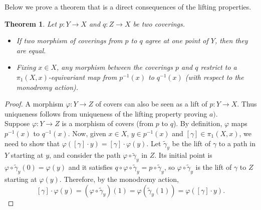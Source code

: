 \documentclass{article}
\theoremstyle{plain}
\newtheorem{theorem}{Theorem}[subsection]
\theoremstyle{definition}
\newtheorem{definition}[theorem]{Definition}
\begin{document}

\noindent Below we prove a theorem that is a direct consequences of the lifting properties.


\begin{theorem}
\label{property_morphism_covers}
    Let $p:Y\rightarrow X$ and $q:Z\rightarrow X$ be two coverings. 
    \begin{itemize}
        \item[$a)$] If two morphism of coverings from $p$ to $q$ agree at one point of $Y$, then they are equal.
        \item[$b)$] Fixing $x\in X$, any morphism between the coverings $p$ and $q$ restrict to a $\pi_1(X,x)$-equivariant map from $p^{-1}(x)$ to $q^{-1}(x)$ (with respect to the monodromy action).
    \end{itemize}
\end{theorem}
\begin{proof}
    A morphism $\varphi:Y\rightarrow Z$ of covers can also be seen as a lift of $p:Y\rightarrow X$. Thus uniqueness follows from uniqueness of the lifting property proving $a)$.\\
    Suppose $\varphi:Y\rightarrow Z$ is a morphism of covers (from $p$ to $q$).
    By definition, $\varphi$ maps $p^{-1}(x)$ to $q^{-1}(x)$.
    Now, given $x\in X$, $y\in p^{-1}(x)$ and $[\gamma]\in\pi_1(X,x)$, we need to show that $\varphi([\gamma]\cdot y)= [\gamma]\cdot\varphi(y)$.
    Let $\widetilde{\gamma}_y$ be the lift of $\gamma$ to a path in $Y$ starting at $y$, and consider the path $\varphi\circ\widetilde{\gamma}_y$ in $Z$.
    Its initial point is $\varphi\circ\widetilde{\gamma}_y(0) = \varphi(y)$ and it satisfies $q\circ\varphi\circ\widetilde{\gamma}_y = p\circ\widetilde{\gamma}_y$, so $\varphi\circ\widetilde{\gamma}_y$ is the lift of $\gamma$ to $Z$ starting at $\varphi(y)$. Therefore, by the monodromy action,
    $$[\gamma]\cdot\varphi(y) = (\varphi\circ\widetilde{\gamma}_y)(1) = \varphi(\widetilde{\gamma}_y(1)) = \varphi([\gamma]\cdot y).$$
\end{proof}
\end{document}
